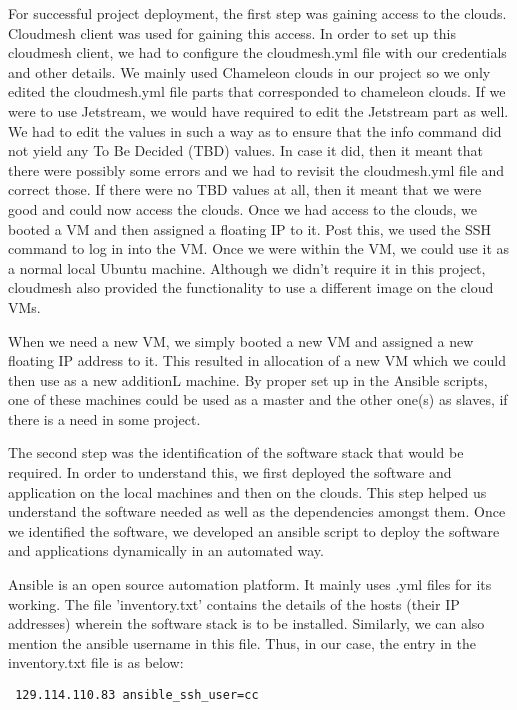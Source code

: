 \documentclass[9pt,twocolumn,twoside]{../../styles/osajnl}
\begin{document}
For successful project deployment, the first step was gaining access
to the clouds.  Cloudmesh client was used for gaining this access.  In
order to set up this cloudmesh client, we had to configure the
cloudmesh.yml file with our credentials and other details.  We mainly
used Chameleon clouds in our project so we only edited the
cloudmesh.yml file parts that corresponded to chameleon clouds.  If we
were to use Jetstream, we would have required to edit the Jetstream
part as well.  We had to edit the values in such a way as to ensure
that the info command did not yield any To Be Decided (TBD) values.
In case it did, then it meant that there were possibly some errors and
we had to revisit the cloudmesh.yml file and correct those.  If there
were no TBD values at all, then it meant that we were good and could
now access the clouds.  Once we had access to the clouds, we booted a
VM and then assigned a floating IP to it.  Post this, we used the SSH
command to log in into the VM.  Once we were within the VM, we could
use it as a normal local Ubuntu machine.  Although we didn't require
it in this project, cloudmesh also provided the functionality to use a
different image on the cloud VMs.

When we need a new VM, we simply booted a new VM and assigned a new
floating IP address to it.  This resulted in allocation of a new VM
which we could then use as a new additionL machine.  By proper set up
in the Ansible scripts, one of these machines could be used as a
master and the other one(s) as slaves, if there is a need in some
project.

The second step was the identification of the software stack that
would be required.  In order to understand this, we first deployed the
software and application on the local machines and then on the
clouds.  This step helped us understand the software needed as well
as the dependencies amongst them.  Once we identified the software,
we developed an ansible script to deploy the software and
applications dynamically in an automated way.

Ansible is an open source automation platform.  It mainly uses .yml
files for its working.  The file 'inventory.txt' contains the details
of the hosts (their IP addresses) wherein the software stack is to be
installed.  Similarly, we can also mention the ansible username in
this file.  Thus, in our case, the entry in the inventory.txt file is
as below:

\begin{lstlisting}
 129.114.110.83 ansible_ssh_user=cc
\end{lstlisting}  
	
\end{document}
